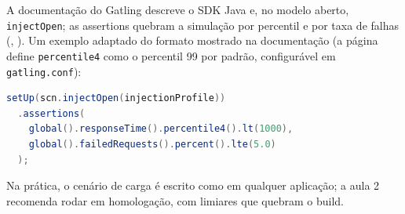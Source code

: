 A documentação do Gatling descreve o SDK Java e, no modelo aberto,
\texttt{injectOpen}; as assertions quebram a simulação por percentil e por
taxa de falhas (,
). Um exemplo adaptado do formato mostrado na documentação (a página define \texttt{percentile4} como o percentil 99 por padrão, configurável em \texttt{gatling.conf}):

\begin{lstlisting}[language=Java]
setUp(scn.injectOpen(injectionProfile))
  .assertions(
    global().responseTime().percentile4().lt(1000),
    global().failedRequests().percent().lte(5.0)
  );
\end{lstlisting}

 Na prática, o cenário de carga é escrito como
em qualquer aplicação; a aula 2 recomenda rodar em homologação, com
limiares que quebram o build.
